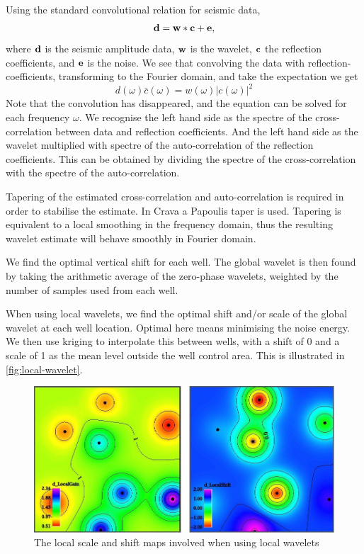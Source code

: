 Using the standard convolutional relation for seismic data,
\begin{equation}
\mathbf{d} = \mathbf{w}*\mathbf{c}+\mathbf{e}, \label{fig:syntseis}
\end{equation}
where $\mathbf{d}$ is the seismic amplitude data, $\mathbf{w}$ is the
wavelet, $\mathbf{c}$ the reflection coefficients, and $\mathbf{e}$ is the
noise. We see that convolving the data with reflection-coefficients, 
transforming to the  Fourier domain, and take the expectation we get
\begin{equation}
d(\omega)\bar{c}(\omega) = w(\omega)|c(\omega)|^2
\end{equation}
Note that the convolution has disappeared, and the equation can be
solved for each frequency $\omega$. We recognise the left hand side as the 
spectre of the cross-correlation between data
and reflection coefficients. And the left hand side as the wavelet multiplied with 
spectre of the auto-correlation of the reflection coefficients. 
This can be obtained by dividing the spectre of the cross-correlation with the 
spectre of the auto-correlation. 

Tapering of the estimated cross-correlation and auto-correlation is required in order to stabilise the estimate. In Crava a Papoulis taper is used. Tapering is equivalent 
to a local smoothing in the frequency domain, thus the resulting wavelet 
estimate will behave smoothly in Fourier domain. 


We find the optimal vertical shift for each well. The global wavelet
is then found by taking the arithmetic average of the zero-phase
wavelets, weighted by the number of samples used from each well.

When using local wavelets, we find the optimal shift and/or scale of
the global wavelet at each well location. Optimal here means
minimising the noise energy. We then use kriging to interpolate this
between wells, with a shift of 0 and a scale of 1 as the mean level
outside the well control area.  This is illustrated in
\autoref{fig:local-wavelet}.

\begin{figure}
  \centering
  \includegraphics[width=.95\linewidth]{images/local-wavelet}
  \caption{The local scale and shift maps involved when using local wavelets}
  \label{fig:local-wavelet}
\end{figure}

